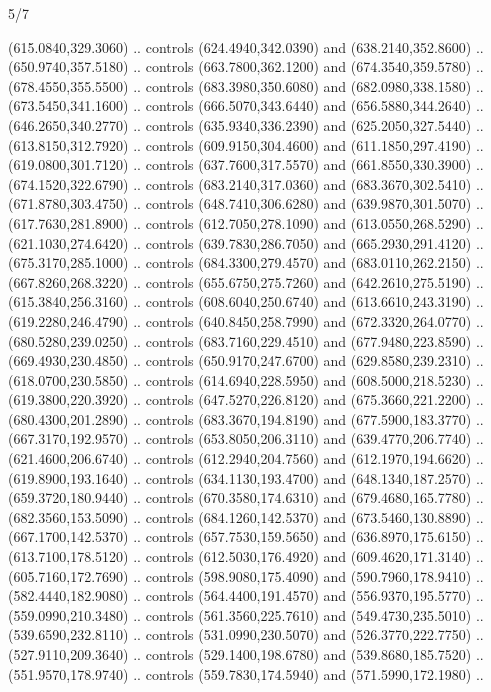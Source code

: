 \begin{flagdescription}{5/7}
\begin{scope}[xshift=0.5\flaglength]
\begin{scope}[scale=0.0019\flagwidth,yshift=190.5mm,xshift=-137.7mm]
\begin{scope}[y=0.80pt, x=0.80pt, yscale=-1, xscale=1, inner sep=0pt, outer sep=0pt]
  (615.0840,329.3060) .. controls (624.4940,342.0390) and (638.2140,352.8600) ..
  (650.9740,357.5180) .. controls (663.7800,362.1200) and (674.3540,359.5780) ..
  (678.4550,355.5500) .. controls (683.3980,350.6080) and (682.0980,338.1580) ..
  (673.5450,341.1600) .. controls (666.5070,343.6440) and (656.5880,344.2640) ..
  (646.2650,340.2770) .. controls (635.9340,336.2390) and (625.2050,327.5440) ..
  (613.8150,312.7920) .. controls (609.9150,304.4600) and (611.1850,297.4190) ..
  (619.0800,301.7120) .. controls (637.7600,317.5570) and (661.8550,330.3900) ..
  (674.1520,322.6790) .. controls (683.2140,317.0360) and (683.3670,302.5410) ..
  (671.8780,303.4750) .. controls (648.7410,306.6280) and (639.9870,301.5070) ..
  (617.7630,281.8900) .. controls (612.7050,278.1090) and (613.0550,268.5290) ..
  (621.1030,274.6420) .. controls (639.7830,286.7050) and (665.2930,291.4120) ..
  (675.3170,285.1000) .. controls (684.3300,279.4570) and (683.0110,262.2150) ..
  (667.8260,268.3220) .. controls (655.6750,275.7260) and (642.2610,275.5190) ..
  (615.3840,256.3160) .. controls (608.6040,250.6740) and (613.6610,243.3190) ..
  (619.2280,246.4790) .. controls (640.8450,258.7990) and (672.3320,264.0770) ..
  (680.5280,239.0250) .. controls (683.7160,229.4510) and (677.9480,223.8590) ..
  (669.4930,230.4850) .. controls (650.9170,247.6700) and (629.8580,239.2310) ..
  (618.0700,230.5850) .. controls (614.6940,228.5950) and (608.5000,218.5230) ..
  (619.3800,220.3920) .. controls (647.5270,226.8120) and (675.3660,221.2200) ..
  (680.4300,201.2890) .. controls (683.3670,194.8190) and (677.5900,183.3770) ..
  (667.3170,192.9570) .. controls (653.8050,206.3110) and (639.4770,206.7740) ..
  (621.4600,206.6740) .. controls (612.2940,204.7560) and (612.1970,194.6620) ..
  (619.8900,193.1640) .. controls (634.1130,193.4700) and (648.1340,187.2570) ..
  (659.3720,180.9440) .. controls (670.3580,174.6310) and (679.4680,165.7780) ..
  (682.3560,153.5090) .. controls (684.1260,142.5370) and (673.5460,130.8890) ..
  (667.1700,142.5370) .. controls (657.7530,159.5650) and (636.8970,175.6150) ..
  (613.7100,178.5120) .. controls (612.5030,176.4920) and (609.4620,171.3140) ..
  (605.7160,172.7690) .. controls (598.9080,175.4090) and (590.7960,178.9410) ..
  (582.4440,182.9080) .. controls (564.4400,191.4570) and (556.9370,195.5770) ..
  (559.0990,210.3480) .. controls (561.3560,225.7610) and (549.4730,235.5010) ..
  (539.6590,232.8110) .. controls (531.0990,230.5070) and (526.3770,222.7750) ..
  (527.9110,209.3640) .. controls (529.1400,198.6780) and (539.8680,185.7520) ..
  (551.9570,178.9740) .. controls (559.7830,174.5940) and (571.5990,172.1980) ..

\end{scope}
\end{scope}
\end{scope}
\end{flagdescription}
